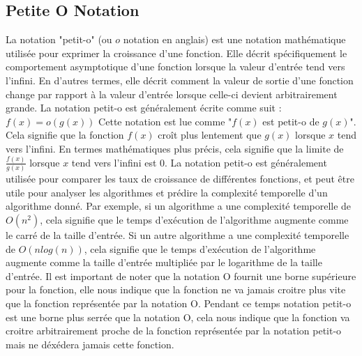 \documentclass{article}
\begin{document}
            \subsection*{Petite O Notation}
    La notation "petit-o" (ou $o$ notation en anglais) est une notation mathématique utilisée pour exprimer la croissance d'une fonction. Elle décrit spécifiquement le comportement asymptotique d'une fonction lorsque la valeur d'entrée tend vers l'infini. En d'autres termes, elle décrit comment la valeur de sortie d'une fonction change par rapport à la valeur d'entrée lorsque celle-ci devient arbitrairement grande.
    La notation petit-o est généralement écrite comme suit :
    $f(x) = o(g(x))$
    Cette notation est lue comme "$f(x)$ est petit-o de $g(x)$". Cela signifie que la fonction $f(x)$ croît plus lentement que $g(x)$ lorsque $x$ tend vers l'infini. En termes mathématiques plus précis, cela signifie que la limite de $\frac{f(x)}{g(x)}$ lorsque $x$ tend vers l'infini est $0$.
    La notation petit-o est généralement utilisée pour comparer les taux de croissance de différentes fonctions, et peut être utile pour analyser les algorithmes et prédire la complexité temporelle d'un algorithme donné. Par exemple, si un algorithme a une complexité temporelle de $O(n^2)$, cela signifie que le temps d'exécution de l'algorithme augmente comme le carré de la taille d'entrée. Si un autre algorithme a une complexité temporelle de $O(n log(n))$, cela signifie que le temps d'exécution de l'algorithme augmente comme la taille d'entrée multipliée par le logarithme de la taille d'entrée. Il est important de noter que la notation O fournit une borne supérieure pour la fonction, elle nous indique que la fonction ne va jamais croitre plus vite que la fonction représentée par la notation O. Pendant ce temps notation petit-o est une borne plus serrée que la notation O, cela nous indique que la fonction va croitre arbitrairement proche de la fonction représentée par la notation petit-o mais ne déxédera jamais cette fonction.
\end{document}
